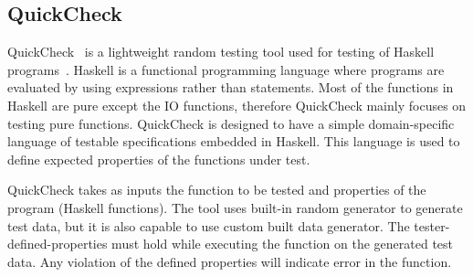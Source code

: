 \subsection{QuickCheck}
QuickCheck~\cite{claessen2011quickcheck} is a lightweight random testing tool used for testing of Haskell programs~\cite{hudak2007history}. Haskell is a functional programming language where programs are evaluated by using expressions rather than statements. Most of the functions in Haskell are pure except the IO functions, therefore QuickCheck mainly focuses on testing pure functions. QuickCheck is designed to have a simple domain-specific language of testable specifications embedded in Haskell. This language is used to define expected properties of the functions under test. %

QuickCheck takes as inputs the function to be tested and properties of the program (Haskell functions). The tool uses built-in random generator to generate test data, but it is also capable to use custom built data generator. The tester-defined-properties must hold while executing the function on the generated test data. Any violation of the defined properties will indicate error in the function.







